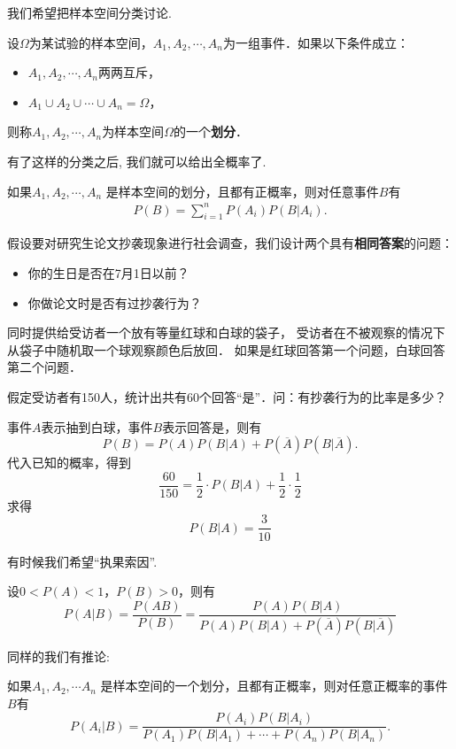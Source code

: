 我们希望把样本空间分类讨论. 

\begin{definition}
    设$\Omega$为某试验的样本空间，$A_1, A_2, \cdots, A_n$为一组事件．如果以下条件成立：
    \begin{itemize}
        \item $A_1, A_2, \cdots, A_n$两两互斥，
        \item $A_1 \cup A_2 \cup \cdots \cup A_n=\Omega$，
    \end{itemize}
    则称$A_1, A_2, \cdots , A_n$为样本空间$\Omega$的一个\textbf{划分}．
\end{definition}

有了这样的分类之后, 我们就可以给出全概率了. 

\begin{theorem}[全概率公式]
    如果$A_1, A_2, \cdots, A_n$ 是样本空间的划分，且都有正概率，则对任意事件$B$有
    \begin{align*}
        P(B)=\sum_{i=1}^n P(A_i) P(B|A_i).
    \end{align*}
\end{theorem}

\begin{example}
    假设要对研究生论文抄袭现象进行社会调查，我们设计两个具有\textbf{相同答案}的问题：
        \begin{itemize}
            \item 你的生日是否在7月1日以前？
            \item 你做论文时是否有过抄袭行为？
        \end{itemize}
        同时提供给受访者一个放有等量红球和白球的袋子，
        受访者在不被观察的情况下从袋子中随机取一个球观察颜色后放回．
        如果是红球回答第一个问题，白球回答第二个问题．

        假定受访者有150人，统计出共有60个回答“是”．问：有抄袭行为的比率是多少？
\end{example}

\begin{solution}
    事件$A$表示抽到白球，事件$B$表示回答是，则有
    $$P(B)=P(A)P(B|A)+P(\overline{A})P(B|\overline{A}).$$
    代入已知的概率，得到
    $$\frac{60}{150}=\frac12\cdot P(B|A)+\frac12\cdot\frac12 $$
    求得
    $$P(B|A)=\frac{3}{10}$$
\end{solution}

有时候我们希望``执果索因''. 

\begin{theorem}[Bayes定理]
    设$0<P(A)<1$，$P(B)>0$，则有
    $$P(A|B)=\frac{P(AB)}{P(B)}
        =\frac{P(A)P(B|A)}{P(A)P(B|A)+P(\overline{A})P(B|\overline{A})}$$
\end{theorem}

同样的我们有推论: 

\begin{corollary}
    如果$A_1, A_2, \cdots A_n$ 是样本空间的一个划分，且都有正概率，则对任意正概率的事件$B$有
    \[
        P(A_i|B)=\frac{P(A_i)P(B|A_i)}{P(A_1)P(B|A_1)+\cdots+P(A_n)P(B|A_n)}.%
    \]
\end{corollary}
